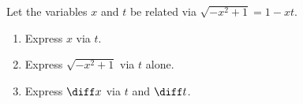 Let the variables $x$ and $t$ be related via $\sqrt{-x^2+1}=1-xt$.
\begin{enumerate}
\item \label{problemEulerSub-case1-sin(2arctant)-alternative-exposition-x-via-t}  Express $x$ via $t$.
\item \label{problemEulerSub-case1-sin(2arctant)-alternative-exposition-radical-via-t} Express $\sqrt{-x^2+1}$ via $t$ alone.
\item Express $\diff x$ via $t$ and $\diff t$.
\end{enumerate}